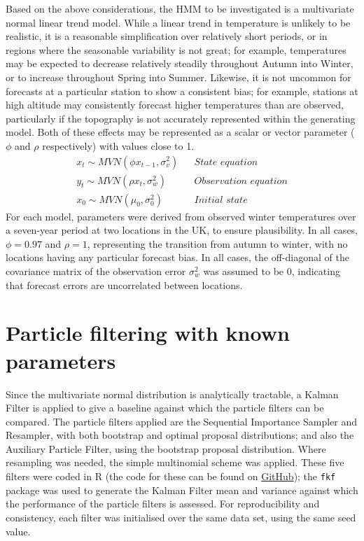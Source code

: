 \documentclass[10pt,fleqn]{article}
\begin{document}
Based on the above considerations, the HMM to be investigated is a multivariate normal linear trend model. While a linear trend in temperature is unlikely to be realistic, it is a reasonable simplification over relatively short periods, or in regions where the seasonable variability is not great; for example, temperatures may be expected to decrease relatively steadily throughout Autumn into Winter, or to increase throughout Spring into Summer. Likewise, it is not uncommon for forecasts at a particular station to show a consistent bias; for example, stations at high altitude may consistently forecast higher temperatures than are observed, particularly if the topography is not accurately represented within the generating model. Both of these effects may be represented as a scalar or vector parameter ($\phi$ and $\rho$ respectively) with values close to 1. 
%
\begin{align*}
x_t \sim MVN(\phi x_{t-1}, \sigma_v^2)  && \textit{State equation} \\
y_t \sim MVN(\rho x_t, \sigma_w^2) && \textit{Observation equation} \\
x_0 \sim MVN(\mu_0, \sigma_0^2) && \textit{Initial state}
\end{align*}
%
For each model, parameters were derived from observed winter temperatures over a seven-year period at two locations in the UK, to ensure plausibility. In all cases, $\phi = 0.97$ and $\rho = 1$, representing the transition from autumn to winter, with no locations having any particular forecast bias. In all cases, the off-diagonal of the covariance matrix of the observation error $\sigma_w^2$ was assumed to be 0, indicating that forecast errors are uncorrelated between locations.

\section{Particle filtering with known parameters}

Since the multivariate normal distribution is analytically tractable, a Kalman Filter is applied to give a baseline against which the particle filters can be compared. The particle filters applied are the Sequential Importance Sampler and Resampler, with both bootstrap and optimal proposal distributions; and also the Auxiliary Particle Filter, using the bootstrap proposal distribution. Where resampling was needed, the simple multinomial scheme was applied. These five filters were coded in R (the code for these can be found on  \href{https://github.com/ClairBee/particle-filters/blob/master/PF.R}{GitHub}); the \texttt{fkf} package was used to generate the Kalman Filter mean and variance against which the performance of the particle filters is assessed. For reproducibility and consistency, each filter was initialised over the same data set, using the same seed value.
\end{document}
